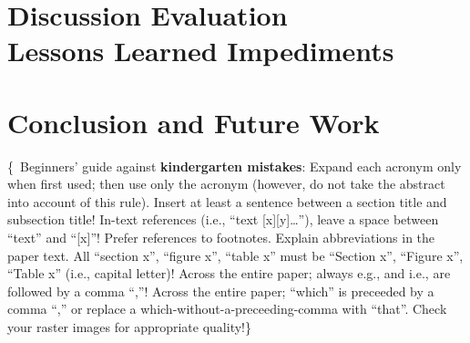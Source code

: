 \documentclass[conference,a4paper,flushend]{cs-techrep} %
\begin{document}
\section{Discussion \textbar{} Evaluation \textbar{} \\ Lessons Learned \textbar{} Impediments}
\lipsum[16]

\section{Conclusion and Future Work \textbar{} \\ }
\lipsum[17]

\vspace{\baselineskip}
\{\,\faWarning{} Beginners' guide against \textbf{kindergarten mistakes}:
Expand each acronym only when first used; then use only the acronym (however, do not take the abstract into account of this rule).
Insert at least a sentence between a section title and subsection title!
In-text references (i.e., \enquote{text [x][y]\ldots{}}), leave a space between \enquote{text} and \enquote{[x]}!
Prefer references to footnotes.
Explain abbreviations in the paper text.
All \enquote{section x}, \enquote{figure x}, \enquote{table x} must be \enquote{Section x}, \enquote{Figure x}, \enquote{Table x} (i.e., capital letter)!
Across the entire paper; always e.g., and i.e., are followed by a comma \enquote{,}!
Across the entire paper; \enquote{which} is preceeded by a comma \enquote{,} or replace a which-without-a-preceeding-comma with \enquote{that}.
Check your raster images for appropriate quality!\}
\end{document}
